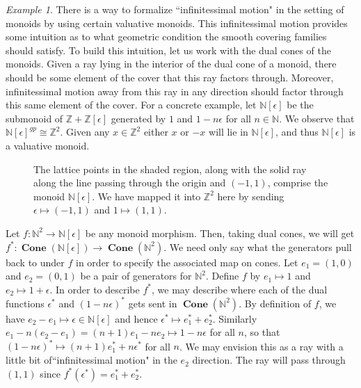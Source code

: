 \documentclass[12pt]{amsart}
\numberwithin{equation}{section}
\theoremstyle{plain}
\theoremstyle{remark}
\newtheorem{exm}[equation]{Example}
\DeclareMathOperator{\Cone}{\textbf{Cone}}
\newcommand{\Z}{\mathbb Z}
\newcommand{\NN}{\mathbb N}
\begin{document}
\begin{exm}
	There is a way to formalize ``infinitessimal motion" in the setting of monoids by using certain valuative monoids. This infinitessimal motion provides some intuition as to what geometric condition the smooth covering families should satisfy. To build this intuition, let us work with the dual cones of the monoids. Given a ray lying in the interior of the dual cone of a monoid, there should be some element of the cover that this ray factors through. Moreover, infinitessimal motion away from this ray in any direction should factor through this same element of the cover. For a concrete example, let $\NN[\epsilon]$ be the submonoid of $\Z + \Z[\epsilon]$ generated by $1$ and $1-n\epsilon$ for all $n\in\NN$. We observe that $\NN[\epsilon]^{gp} \cong \Z^2$. Given any $x\in\Z^2$ either $x$ or $-x$ will lie in $\NN[\epsilon]$, and thus $\NN[\epsilon]$ is a valuative monoid. 
\begin{figure}[h!]\label{FuzzyMonoid}
	\begin{center}
		\caption{ The lattice points in the shaded region, along with the solid ray along the line passing through the origin and $(-1,1)$, comprise the monoid $\NN[\epsilon]$. We have mapped it into $\Z^2$ here by sending $\epsilon\mapsto (-1,1)$ and $1\mapsto (1,1)$.}
	\end{center}
\end{figure}	
	Let $f: \NN^2\to \NN[\epsilon]$ be any monoid morphism. Then, taking dual cones, we will get $f^*: \Cone(\NN[\epsilon])\to \Cone(\NN^2)$. We need only say what the generators pull back to under $f$ in order to specify the associated map on cones. Let $e_1 = (1,0)$ and $e_2 = (0,1)$ be a pair of generators for $\NN^2$. Define $f$ by $e_1\mapsto 1$ and $e_2\mapsto 1+\epsilon$. In order to describe $f^*$, we may describe where each of the dual functions $\epsilon^*$ and $(1-n\epsilon)^*$ gets sent in $\Cone(\NN^2)$. By definition of $f$, we have $e_2 - e_1\mapsto \epsilon\in\NN[\epsilon]$ and hence $\epsilon^*\mapsto e_1^* + e_2^*$. Similarly $e_1 - n(e_2 - e_1) = (n+1)e_1 - ne_2 \mapsto 1 - n\epsilon$ for all $n$, so that $(1-n\epsilon)^*\mapsto (n+1)e_1^* + n\epsilon^*$ for all $n$. We may envision this as a ray with a little bit of``infinitessimal motion" in the $e_2$ direction. The ray will pass through $(1,1)$ since $f^*(\epsilon^*) = e_1^* + e_2^*$.  

\end{exm}
\end{document}
